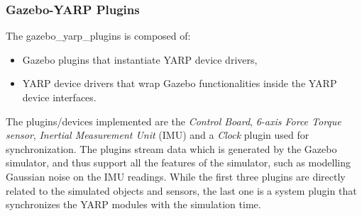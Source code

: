 \subsubsection{Gazebo-YARP Plugins}
The gazebo\_yarp\_plugins is composed of:
\begin{itemize}
    \item Gazebo plugins that instantiate YARP device drivers,
    \item YARP device drivers that wrap Gazebo functionalities inside the YARP device interfaces.
\end{itemize}
The plugins/devices implemented are the \emph{Control Board}, \emph{6-axis Force Torque sensor}, \emph{Inertial Measurement Unit} (IMU) and a \emph{Clock} plugin used for synchronization. The plugins stream data which is generated by the Gazebo simulator, and thus support all the features of the simulator, such as modelling Gaussian noise on the IMU readings.
While the first three plugins are directly related to the simulated objects and sensors, the last one is a system plugin that synchronizes the YARP modules with the simulation time.

